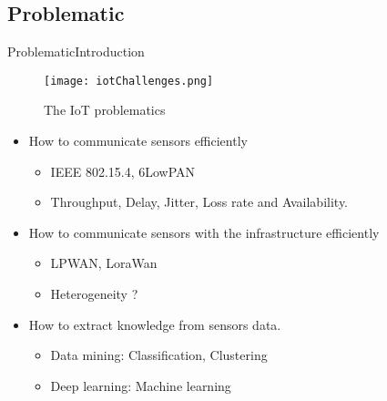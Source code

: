 \subsection*{Problematic}
\begin{frame}{Problematic}{Introduction} %


\begin{figure}
	\texttt{[image: iotChallenges.png]}
	\caption{\label{fig:iotChallenges}The IoT problematics}
\end{figure}
\begin{itemize}
	\item How to communicate sensors efficiently
		\begin{itemize}
			\item IEEE 802.15.4, 6LowPAN
			\item Throughput, Delay, Jitter, Loss rate and Availability.
		\end{itemize}
	\item How to communicate sensors with the infrastructure efficiently
		\begin{itemize}
			\item LPWAN, LoraWan
			\item Heterogeneity ?
		\end{itemize}
	\item How to extract knowledge from sensors data.
		\begin{itemize}
			\item Data mining: Classification, Clustering
			\item Deep learning: Machine learning
		\end{itemize}
	\end{itemize}
	\end{frame}
